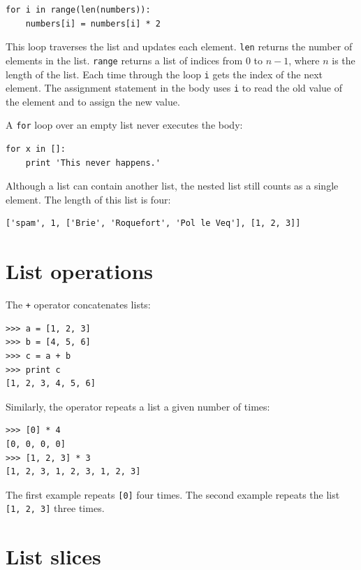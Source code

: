 \documentclass[10pt]{book}
\begin{document}
\begin{CJK}{UTF8}{gbsn}
\begin{verbatim}
for i in range(len(numbers)):
    numbers[i] = numbers[i] * 2
\end{verbatim}
%
This loop traverses the list and updates each element.  {\tt len}
returns the number of elements in the list.  {\tt range} returns
a list of indices from 0 to $n-1$, where $n$ is the length of
the list.  Each time through the loop {\tt i} gets the index
of the next element.  The assignment statement in the body uses
{\tt i} to read the old value of the element and to assign the
new value.

A {\tt for} loop over an empty list never executes the body:

\begin{verbatim}
for x in []:
    print 'This never happens.'
\end{verbatim}
%
Although a list can contain another list, the nested
list still counts as a single element.  The length of this list is
four:

\begin{verbatim}
['spam', 1, ['Brie', 'Roquefort', 'Pol le Veq'], [1, 2, 3]]
\end{verbatim}



\section{List operations}

The {\tt +} operator concatenates lists:

\begin{verbatim}
>>> a = [1, 2, 3]
>>> b = [4, 5, 6]
>>> c = a + b
>>> print c
[1, 2, 3, 4, 5, 6]
\end{verbatim}
%
Similarly, the {\tt *} operator repeats a list a given number of times:

\begin{verbatim}
>>> [0] * 4
[0, 0, 0, 0]
>>> [1, 2, 3] * 3
[1, 2, 3, 1, 2, 3, 1, 2, 3]
\end{verbatim}
%
The first example repeats {\tt [0]} four times.  The second example
repeats the list {\tt [1, 2, 3]} three times.


\section{List slices}


\end{CJK}
\end{document}
